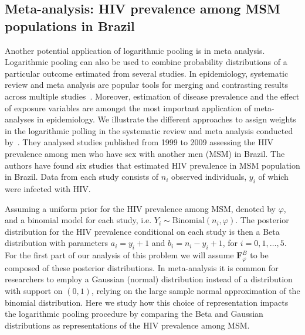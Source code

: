 \documentclass[a4paper, notitlepage, 10pt]{article}
\begin{document}
\subsection{Meta-analysis: HIV prevalence among MSM populations in Brazil}
\label{sec:metaAnalysis}

Another potential application of logarithmic pooling is in meta analysis.
Logarithmic pooling can also be used to combine probability distributions of a particular outcome estimated from several studies. 
In epidemiology, systematic review and meta analysis are popular tools for merging and contrasting results across multiple studies~\citep[Chapter 33]{Rothman2008}.
Moreover, estimation of disease prevalence and the effect of exposure variables are amongst the most important application of meta-analyses in epidemiology.
We illustrate the different approaches to assign weights in the logarithmic polling in the systematic review and meta analysis conducted by~\citet{Malta2010}. 
They analysed studies published from 1999 to 2009 assessing the HIV prevalence among men who have sex with another men (MSM) in Brazil. 
The authors have found six studies that estimated HIV prevalence in MSM population in Brazil. 
Data from each study consists of $n_i$ observed individuals, $y_i$ of which were infected with HIV.

Assuming a uniform prior for the HIV prevalence among MSM, denoted by $\varphi$, and a binomial model for each study, i.e. $Y_i \sim \text{Binomial}(n_i, \varphi)$. 
The posterior distribution for the HIV prevalence conditional on each study is then a Beta distribution with parameters $a_i = y_i + 1$ and $b_i = n_i - y_i + 1$, for $i=0,1, \ldots, 5$.
For the first part of our analysis of this problem we will assume $\boldsymbol F^{B}_\varphi$ to be composed of these posterior distributions.
In meta-analysis it is common for researchers to employ a Gaussian (normal) distribution instead of a distribution with support on $(0, 1)$, relying on the large sample normal approximation of the binomial distribution. 
Here we study how this choice of representation impacts the logarithmic pooling procedure by comparing the Beta and Gaussian distributions as representations of the HIV prevalence among MSM.
\end{document}
